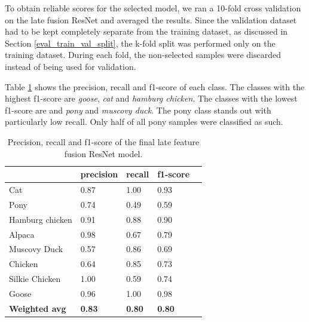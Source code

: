 \documentclass{l4proj}
\begin{document}
To obtain reliable scores for the selected model, we ran a 10-fold cross validation on the late fusion ResNet and averaged the results. Since the validation dataset had to be kept completely separate from the training dataset, as discussed in Section \ref{eval_train_val_split}, the k-fold split was performed only on the training dataset. During each fold, the non-selected samples were discarded instead of being used for validation.

Table \ref{table:final_classifier_scores} shows the precision, recall and f1-score of each class. The classes with the highest f1-score are \textit{goose}, \textit{cat} and \textit{hamburg chicken}. The classes with the lowest f1-score are and \textit{pony} and \textit{muscovy duck}. The pony class stands out with particularly low recall. Only half of all pony samples were classified as such.

\begin{table}[ht]
  \centering
  \begin{tabular}{@{}lllll@{}}
  \toprule
                        & \textbf{precision} & \textbf{recall} & \textbf{f1-score} &  \\ \midrule
  Cat                   & 0.87               & 1.00            & 0.93              &  \\
  Pony                  & 0.74               & 0.49            & 0.59              &  \\
  Hamburg chicken       & 0.91               & 0.88            & 0.90              &  \\
  Alpaca                & 0.98               & 0.67            & 0.79              &  \\
  Muscovy Duck          & 0.57               & 0.86            & 0.69              &  \\
  Chicken               & 0.64               & 0.85            & 0.73              &  \\
  Silkie Chicken        & 1.00               & 0.59            & 0.74              &  \\
  Goose                 & 0.96               & 1.00            & 0.98              &  \\
  \midrule
  \textbf{Weighted avg} & \textbf{0.83}      & \textbf{0.80}   & \textbf{0.80}     &  \\ \bottomrule
  \end{tabular}
  \caption{Precision, recall and f1-score of the final late feature fusion ResNet model.}
  \label{table:final_classifier_scores}
\end{table}
\end{document}
